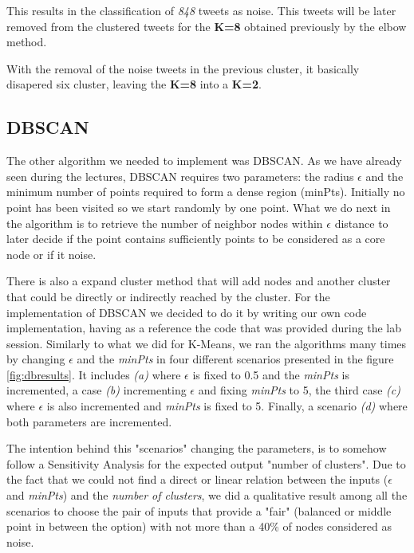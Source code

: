 \documentclass{article}
\begin{document}
This results in the classification of \textit{848} tweets as noise. This tweets will be later removed from the clustered tweets for the \textbf{K=8} obtained previously
by the elbow method.

With the removal of the noise tweets in the previous cluster, it basically disapered six cluster, leaving the \textbf{K=8} into a \textbf{K=2}.

\subsection{DBSCAN}
            
The other algorithm we needed to implement was DBSCAN. As we have already seen during the lectures, DBSCAN requires two parameters: the
radius $\epsilon$ and the minimum number of points required to form a dense region (minPts). Initially no point has been visited so we start 
randomly by one point. What we do next in the algorithm is to retrieve the number of neighbor nodes within $\epsilon$ distance to later decide if the point 
contains sufficiently points to be considered as a core node or if it noise.

There is also a expand cluster method that will add nodes and another cluster that could be directly or indirectly reached by the cluster. For the implementation of DBSCAN we decided to do it by writing our 
own code implementation, having as a reference the code that was provided during the lab session. Similarly to what we did for K-Means, we ran the algorithms many times by changing $\epsilon$ and the \textit{minPts} in four different scenarios presented in the figure \ref{fig:dbresults}. It 
includes \textit{(a)} where $\epsilon$ is fixed to 0.5 and the  \textit{minPts} is incremented, a case \textit{(b)} incrementing $\epsilon$ and fixing \textit{minPts} to 5, the third case \textit{(c)} where $\epsilon$ is also incremented and \textit{minPts} is fixed to 5. Finally, a scenario \textit{(d)} where 
both parameters are incremented.

The intention behind this "scenarios" changing the parameters, is to somehow follow a Sensitivity Analysis for the expected output "number of clusters". Due to the fact that we could not find a direct or linear relation between the inputs ($\epsilon$ and \textit{minPts}) and the \textit{number of clusters}, we did a qualitative
result among all the scenarios to choose the pair of inputs that provide a "fair" (balanced or middle point in between the option) with not more than a 40\% of nodes considered as noise.
\end{document}

